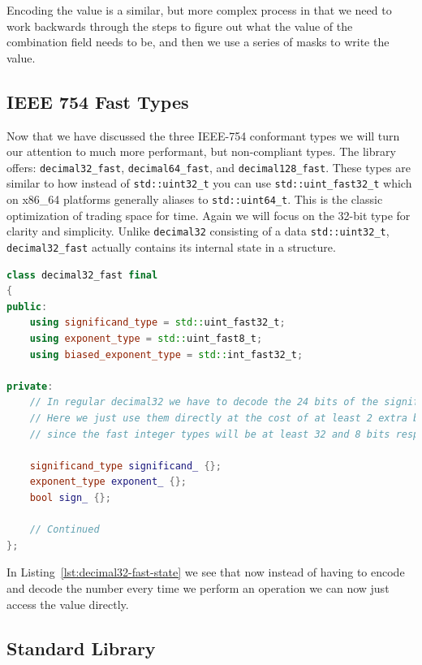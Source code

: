 \documentclass[acmsmall]{acmart}
\newcommand{\code}[1]{\texttt{#1}}
\begin{document}
Encoding the value is a similar, but more complex process in that we need to work backwards through the steps to figure out what the value of the combination field needs to be,
and then we use a series of masks to write the value.

\subsection{IEEE 754 Fast Types}

Now that we have discussed the three IEEE-754 conformant types we will turn our attention to much more performant, but non-compliant types.
The library offers: \code{decimal32\_fast}, \code{decimal64\_fast}, and \code{decimal128\_fast}.
These types are similar to how instead of \code{std::uint32\_t} you can use \code{std::uint\_fast32\_t} which on x86\_64 platforms generally aliases to \code{std::uint64\_t}.
This is the classic optimization of trading space for time.
Again we will focus on the 32-bit type for clarity and simplicity.
Unlike \code{decimal32} consisting of a data \code{std::uint32\_t}, \code{decimal32\_fast} actually contains its internal state in a structure.

\begin{lstlisting}[language=C++, caption={Internal state of \code{decimal32\_fast}}, label={lst:decimal32-fast-state}]
class decimal32_fast final
{
public:
    using significand_type = std::uint_fast32_t;
    using exponent_type = std::uint_fast8_t;
    using biased_exponent_type = std::int_fast32_t;

private:
    // In regular decimal32 we have to decode the 24 bits of the significand and the 8 bits of the exp
    // Here we just use them directly at the cost of at least 2 extra bytes of internal state
    // since the fast integer types will be at least 32 and 8 bits respectively

    significand_type significand_ {};
    exponent_type exponent_ {};
    bool sign_ {};
    
    // Continued
};
\end{lstlisting}

In Listing~\ref{lst:decimal32-fast-state} we see that now instead of having to encode and decode the number every time we perform an operation we can now just access the value directly.


\subsection{Standard Library}
\end{document}

